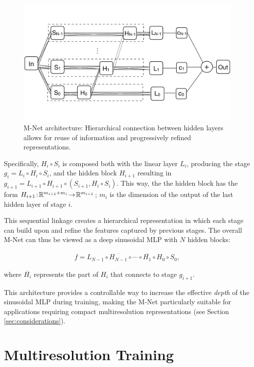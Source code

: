 \begin{figure}[!h]
    \centering
    \includegraphics[width=0.75\linewidth]{img/ch4/mnet.pdf}
    \caption{M-Net architecture: Hierarchical connection between hidden layers allows for reuse of information and progressively refined representations.}
    \label{f:m-net}
\end{figure}
    
Specifically, $H_i\circ  S_i$ is composed both with the linear layer $L_i$, producing the stage $g_i\! =\! L_i\!\circ\! H_i\!\circ\!  S_i$, and the hidden block $H_{i+1}$ resulting in $g_{i+1}\! =\! L_{i+1}\!\circ H_{i+1}\!\circ\left(S_{i+1}, H_i\circ  S_i\right)$. This way, the the hidden block has the form $H_{i+1}\!:\!\mathbb{R}^{m_{i+1} + m_i}\!\to\! \mathbb{R}^{m_{i+1}}$; $m_i$ is the dimension of the output of the last hidden layer of stage $i$. 

This sequential linkage creates a hierarchical representation in which each stage can build upon and refine the features captured by previous stages. The overall M-Net can thus be viewed as a deep sinusoidal MLP with \( N \) hidden blocks:

\begin{align}
    f = L_{N-1} \circ \overline{H_{N-1}} \circ \cdots \circ \overline{H_1} \circ H_0 \circ S_0,
\end{align}

where \( \overline{H_i} \) represents the part of \( H_i \) that connects to stage \( g_{i+1} \).

This architecture provides a controllable way to increase the effective \textit{depth} of the sinusoidal MLP during training, making the M-Net particularly suitable for applications requiring compact multiresolution representations (see Section \ref{sec:considerations}).


\section{Multiresolution Training}\label{sec:mr_training}
\label{s:training}

